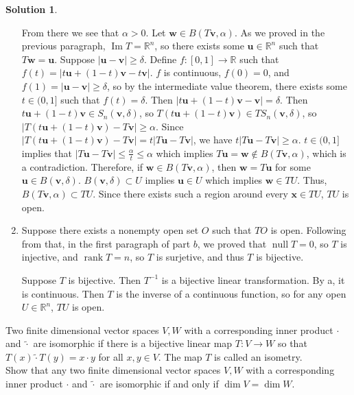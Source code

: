 \documentclass[11pt]{article}
\theoremstyle{definition}
\newenvironment{customex}[1]
  {\renewcommand\theinnercustomex{#1}\innercustomex}
  {\endinnercustomex}
\newtheorem*{solution}{Solution}
\newcommand{\R}{\mathbb{R}}
\DeclareMathOperator{\nul}{null}
\DeclareMathOperator{\rank}{rank}
\DeclareMathOperator{\im}{Im}
\newcommand{\de}{\delta}
\newcommand{\vv}{\mathbf{v}}
\newcommand{\vu}{\mathbf{u}}
\newcommand{\vw}{\mathbf{w}}
\newcommand{\vx}{\mathbf{x}}
\begin{document}
\begin{solution}
\begin{enumerate}[label=\alph*)]
            From there we see that $\alpha > 0$. Let $\vw \in B(T\vv, \alpha)$. As we proved in the previous paragraph, $\im T = \R^n$, so there exists some $\vu \in \R^n$ such that $T\vw = \vu$. Suppose $|\vu - \vv| \ge \delta$. Define $f: [0,1] \to \R$ such that $f(t) = |t\vu + (1-t)\vv - t\vv|$. $f$ is continuous, $f(0) = 0$, and $f(1) = |\vu - \vv| \ge \delta$, so by the intermediate value theorem, there exists some $t \in (0,1]$ such that $f(t) = \delta$. Then $|t\vu + (1-t)\vv - \vv| = \delta$. Then $t\vu + (1-t)\vv \in S_n(\vv, \de)$, so $T(t\vu + (1-t)\vv) \in TS_n(\vv, \de)$, so $|T(t\vu + (1-t)\vv) - T\vv| \ge \alpha$. Since $|T(t\vu + (1-t)\vv) - T\vv| = t|T\vu - T\vv|$, we have $t|T\vu - T\vv| \ge \alpha$. $t \in (0,1]$ implies that $|T\vu - T\vv| \le \frac{\alpha}{t} \le \alpha$ which implies $T\vu = \vw \notin B(T\vv, \alpha)$, which is a contradiction. Therefore, if $\vw \in B(T\vv, \alpha)$, then $\vw = T\vu$ for some $\vu \in B(\vv, \delta)$. $B(\vv, \delta) \subset U$ implies $\vu \in U$ which implies $\vw \in TU$. Thus, $B(T\vv, \alpha) \subset TU$. Since there exists such a region around every $\vx \in TU$, $TU$ is open.
            \item Suppose there exists a nonempty open set $O$ such that $TO$ is open. Following from that, in the first paragraph of part $b$, we proved that $\nul T = 0$, so $T$ is injective, and $\rank T = n$, so $T$ is surjetive, and thus $T$ is bijective.
            
            Suppose $T$ is bijective. Then $T^{-1}$ is a bijective linear transformation. By a, it is continuous. Then $T$ is the inverse of a continuous function, so for any open $U \in \R^n$, $TU$ is open.
        \end{enumerate}
    \end{solution}

    \begin{customex}{\textbf{1}}
        Two finite dimensional vector spaces $V, W$ with a corresponding inner product $\cdot$ and $\tilde{\cdot}$ are isomorphic if there is a bijective linear map $T : V \to W$ so that $T(x)\tilde{\cdot}T(y) = x\cdot y$ for all $x, y \in V$. The map $T$ is called an isometry.\\
        Show that any two finite dimensional vector spaces $V, W$ with a corresponding inner product $\cdot$ and $\tilde{\cdot}$ are isomorphic if and only if $\dim V= \dim W$.
    \end{customex}
\end{document}
